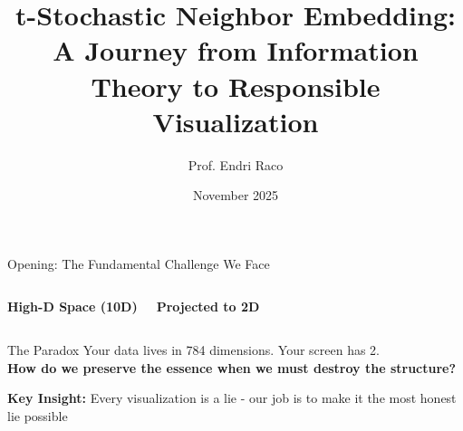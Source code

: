 \documentclass[aspectratio=169]{beamer}
\title{t-Stochastic Neighbor Embedding: A Journey from Information Theory to Responsible Visualization}
\author{Prof. Endri Raco}
\institute{Polytechnic University of Catalonia\\Guest Lecture - Advanced Multivariate Analysis}
\date{November 2025}
\begin{document}
\begin{frame}
\titlepage
\end{frame}

\begin{frame}{Opening: The Fundamental Challenge We Face}
\begin{columns}
\begin{center}
\textbf{High-D Space (10D)}\\
\vspace{0.3cm}
\end{center}

\begin{center}
\textbf{Projected to 2D}\\
\vspace{0.3cm}
\end{center}
\end{columns}

\vspace{0.5cm}
\begin{block}{The Paradox}
Your data lives in 784 dimensions. Your screen has 2.\\
\textbf{How do we preserve the essence when we must destroy the structure?}
\end{block}

\vspace{0.2cm}
\colorbox{yellow!20}{\parbox{0.95\textwidth}{\textbf{Key Insight:} Every visualization is a lie - our job is to make it the most honest lie possible}}
\end{frame}
\end{document}
